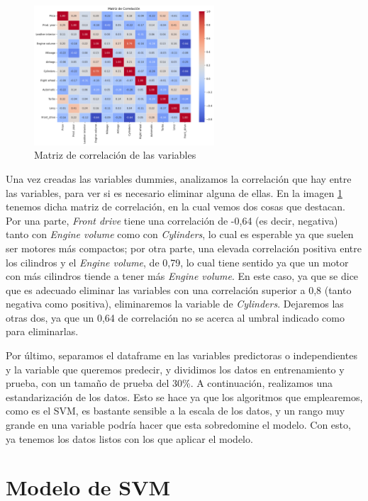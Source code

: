 \documentclass[a4paper,onecolumn]{extarticle}
\let\stdsection\section
\renewcommand\section{\newpage\stdsection}
\begin{document}
\begin{sloppypar}
\begin{figure}[h]
    \centering
    \includegraphics[width=0.6\textwidth]{imgs/correlacion.png}
    \caption{Matriz de correlación de las variables} \label{fig:correlacion}
\end{figure}
Una vez creadas las variables dummies, analizamos la correlación que hay entre las variables, para ver si es necesario eliminar alguna de ellas. En la imagen 
\ref{fig:correlacion} tenemos dicha matriz de correlación, en la cual vemos dos cosas que destacan. Por una parte, \textit{Front drive} tiene una correlación 
de -0,64 (es decir, negativa) tanto con \textit{Engine volume} como con \textit{Cylinders}, lo cual es esperable ya que suelen ser motores más compactos; por 
otra parte, una elevada correlación positiva entre los cilindros y el \textit{Engine volume}, de 0,79, lo cual tiene sentido ya que un motor con más cilindros
tiende a tener más \textit{Engine volume}. En este caso, ya que se dice que es adecuado eliminar las variables con una correlación superior a 0,8 (tanto negativa
como positiva), eliminaremos la variable de \textit{Cylinders}. Dejaremos las otras dos, ya que un 0,64 de correlación no se acerca al umbral indicado como 
para eliminarlas.

Por último, separamos el dataframe en las variables predictoras o independientes y la variable que queremos predecir, y dividimos los datos en entrenamiento y 
prueba, con un tamaño de prueba del 30\%. A continuación, realizamos una estandarización de los datos. Esto se hace ya que los algoritmos que emplearemos, como 
es el SVM, es bastante sensible a la escala de los datos, y un rango muy grande en una variable podría hacer que esta sobredomine el modelo. Con esto, ya tenemos
los datos listos con los que aplicar el modelo.

\section{Modelo de SVM}\label{SVM}

\end{sloppypar}
\end{document}
